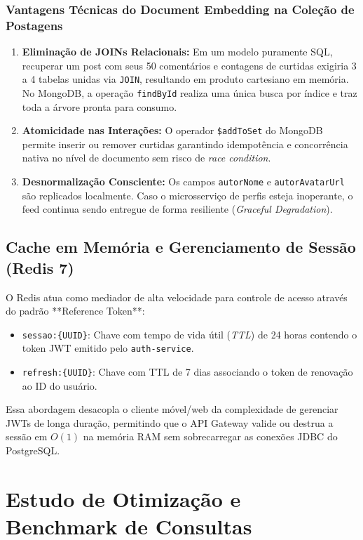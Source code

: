 \documentclass[12pt,a4paper]{report}
\begin{document}
\subsection{Vantagens Técnicas do Document Embedding na Coleção de Postagens}
\begin{enumerate}
    \item \textbf{Eliminação de JOINs Relacionais:} Em um modelo puramente SQL, recuperar um post com seus 50 comentários e contagens de curtidas exigiria 3 a 4 tabelas unidas via \texttt{JOIN}, resultando em produto cartesiano em memória. No MongoDB, a operação \texttt{findById} realiza uma única busca por índice e traz toda a árvore pronta para consumo.
    \item \textbf{Atomicidade nas Interações:} O operador \texttt{\$addToSet} do MongoDB permite inserir ou remover curtidas garantindo idempotência e concorrência nativa no nível de documento sem risco de \textit{race condition}.
    \item \textbf{Desnormalização Consciente:} Os campos \texttt{autorNome} e \texttt{autorAvatarUrl} são replicados localmente. Caso o microsserviço de perfis esteja inoperante, o feed continua sendo entregue de forma resiliente (\textit{Graceful Degradation}).
\end{enumerate}

\section{Cache em Memória e Gerenciamento de Sessão (Redis 7)}
O Redis atua como mediador de alta velocidade para controle de acesso através do padrão **Reference Token**:
\begin{itemize}
    \item \texttt{sessao:\{UUID\}}: Chave com tempo de vida útil (\textit{TTL}) de 24 horas contendo o token JWT emitido pelo \texttt{auth-service}.
    \item \texttt{refresh:\{UUID\}}: Chave com TTL de 7 dias associando o token de renovação ao ID do usuário.
\end{itemize}
Essa abordagem desacopla o cliente móvel/web da complexidade de gerenciar JWTs de longa duração, permitindo que o API Gateway valide ou destrua a sessão em $O(1)$ na memória RAM sem sobrecarregar as conexões JDBC do PostgreSQL.

\chapter{Estudo de Otimização e Benchmark de Consultas}
\end{document}
